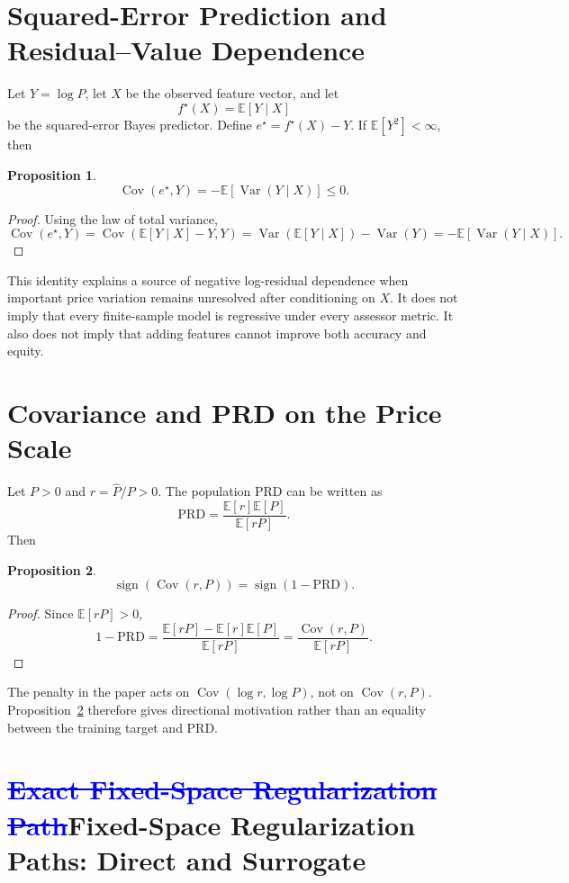 \documentclass[10pt]{article}
\newtheorem{proposition}{Proposition}
\theoremstyle{definition}
\newcommand{\E}{\mathbb{E}}
\newcommand{\Cov}{\operatorname{Cov}}
\newcommand{\Var}{\operatorname{Var}}
\newcommand{\1}{\mathbf{1}}
\newcommand{\oldtext}[1]{\textcolor{blue}{\sout{#1}}}
\newcommand{\newtext}[1]{\textcolor{impGreen}{#1}}
\begin{document}
\section{Squared-Error Prediction and Residual--Value Dependence}
\label{app:population_identity}

Let $Y=\log P$, let $X$ be the observed feature vector, and let
\[
f^\star(X)=\E[Y\mid X]
\]
be the squared-error Bayes predictor. Define $e^\star=f^\star(X)-Y$. If $\E[Y^2]<\infty$, then
\begin{proposition}
\label{prop:bayes_covariance}
\[
\Cov(e^\star,Y)
=
-\E[\Var(Y\mid X)]
\le 0.
\]
\end{proposition}
\begin{proof}
Using the law of total variance,
\[
\Cov(e^\star,Y)
=
\Cov(\E[Y\mid X]-Y,Y)
=
\Var(\E[Y\mid X])-\Var(Y)
=
-\E[\Var(Y\mid X)].
\]
\end{proof}

This identity explains a source of negative log-residual dependence when important price variation remains unresolved after conditioning on $X$. It does not imply that every finite-sample model is regressive under every assessor metric. It also does not imply that adding features cannot improve both accuracy and equity.

\section{Covariance and PRD on the Price Scale}
\label{app:cov_prd}

Let $P>0$ and $r=\widehat P/P>0$. The population PRD can be written as
\[
\mathrm{PRD}
=
\frac{\E[r]\E[P]}{\E[rP]}.
\]
Then
\begin{proposition}
\label{prop:cov_prd}
\[
\operatorname{sign}\!\left(\Cov(r,P)\right)
=
\operatorname{sign}(1-\mathrm{PRD}).
\]
\end{proposition}
\begin{proof}
Since $\E[rP]>0$,
\[
1-\mathrm{PRD}
=
\frac{\E[rP]-\E[r]\E[P]}{\E[rP]}
=
\frac{\Cov(r,P)}{\E[rP]}.
\]
\end{proof}

The penalty in the paper acts on $\Cov(\log r,\log P)$, not on $\Cov(r,P)$. Proposition~\ref{prop:cov_prd} therefore gives directional motivation rather than an equality between the training target and PRD.

\section{\texorpdfstring{\oldtext{Exact Fixed-Space Regularization Path}\newtext{Fixed-Space Regularization Paths: Direct and Surrogate}}{Fixed-Space Regularization Paths: Direct and Surrogate}}
\label{app:theory}
\end{document}
